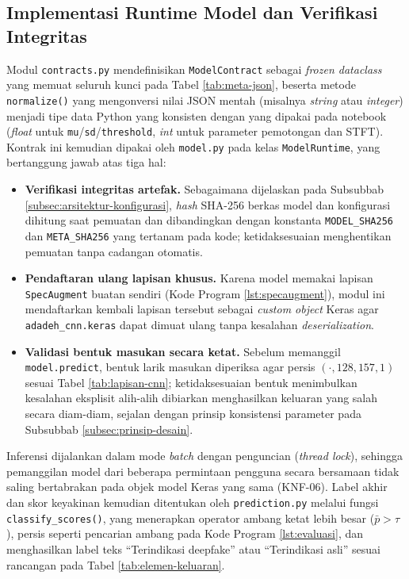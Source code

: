 \subsection{Implementasi Runtime Model dan Verifikasi Integritas}
\label{subsec:implementasi-model-runtime}

Modul \texttt{contracts.py} mendefinisikan \texttt{ModelContract} sebagai
\textit{frozen dataclass} yang memuat seluruh kunci pada Tabel
\ref{tab:meta-json}, beserta metode \texttt{normalize()} yang mengonversi nilai
JSON mentah (misalnya \textit{string} atau \textit{integer}) menjadi tipe data
Python yang konsisten dengan yang dipakai pada notebook (\textit{float} untuk
\texttt{mu}/\texttt{sd}/\texttt{threshold}, \textit{int} untuk parameter
pemotongan dan STFT). Kontrak ini kemudian dipakai oleh \texttt{model.py} pada
kelas \texttt{ModelRuntime}, yang bertanggung jawab atas tiga hal:

\begin{itemize}
  \item \textbf{Verifikasi integritas artefak.} Sebagaimana dijelaskan pada
  Subsubbab \ref{subsec:arsitektur-konfigurasi}, \textit{hash} SHA-256 berkas
  model dan konfigurasi dihitung saat pemuatan dan dibandingkan dengan konstanta
  \texttt{MODEL\_SHA256} dan \texttt{META\_SHA256} yang tertanam pada kode;
  ketidaksesuaian menghentikan pemuatan tanpa cadangan otomatis.
  \item \textbf{Pendaftaran ulang lapisan khusus.} Karena model memakai lapisan
  \texttt{SpecAugment} buatan sendiri (Kode Program \ref{lst:specaugment}),
  modul ini mendaftarkan kembali lapisan tersebut sebagai \textit{custom object}
  Keras agar \texttt{adadeh\_cnn.keras} dapat dimuat ulang tanpa kesalahan
  \textit{deserialization}.
  \item \textbf{Validasi bentuk masukan secara ketat.} Sebelum memanggil
  \texttt{model.predict}, bentuk larik masukan diperiksa agar persis
  $(\cdot,128,157,1)$ sesuai Tabel \ref{tab:lapisan-cnn}; ketidaksesuaian bentuk
  menimbulkan kesalahan eksplisit alih-alih dibiarkan menghasilkan keluaran yang
  salah secara diam-diam, sejalan dengan prinsip konsistensi parameter pada
  Subsubbab \ref{subsec:prinsip-desain}.
\end{itemize}

Inferensi dijalankan dalam mode \textit{batch} dengan penguncian
(\textit{thread lock}), sehingga pemanggilan model dari beberapa permintaan
pengguna secara bersamaan tidak saling bertabrakan pada objek model Keras yang
sama (KNF-06). Label akhir dan skor keyakinan kemudian ditentukan oleh
\texttt{prediction.py} melalui fungsi \texttt{classify\_scores()}, yang
menerapkan operator ambang ketat lebih besar ($\bar{p} > \tau$), persis seperti
pencarian ambang pada Kode Program \ref{lst:evaluasi}, dan menghasilkan label
teks ``Terindikasi deepfake'' atau ``Terindikasi asli'' sesuai rancangan pada
Tabel \ref{tab:elemen-keluaran}.

